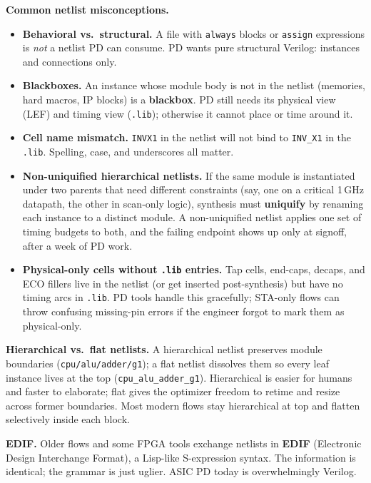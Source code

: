 \begin{pitfall}
\textbf{Common netlist misconceptions.}
\begin{itemize}
  \item \textbf{Behavioral vs.\ structural.} A file with \texttt{always} blocks or \texttt{assign} expressions is \emph{not} a netlist PD can consume. PD wants pure structural Verilog: instances and connections only.
  \item \textbf{Blackboxes.} An instance whose module body is not in the netlist (memories, hard macros, IP blocks) is a \textbf{blackbox}. PD still needs its physical view (LEF) and timing view (\texttt{.lib}); otherwise it cannot place or time around it.
  \item \textbf{Cell name mismatch.} \texttt{INVX1} in the netlist will not bind to \texttt{INV\_X1} in the \texttt{.lib}. Spelling, case, and underscores all matter.
  \item \textbf{Non-uniquified hierarchical netlists.} If the same module is instantiated under two parents that need different constraints (say, one on a critical 1\,GHz datapath, the other in scan-only logic), synthesis must \textbf{uniquify} by renaming each instance to a distinct module. A non-uniquified netlist applies one set of timing budgets to both, and the failing endpoint shows up only at signoff, after a week of PD work.
  \item \textbf{Physical-only cells without \texttt{.lib} entries.} Tap cells, end-caps, decaps, and ECO fillers live in the netlist (or get inserted post-synthesis) but have no timing arcs in \texttt{.lib}. PD tools handle this gracefully; STA-only flows can throw confusing missing-pin errors if the engineer forgot to mark them as physical-only.
\end{itemize}
\end{pitfall}

\begin{sidebar}
\textbf{Hierarchical vs.\ flat netlists.} A hierarchical netlist preserves module boundaries (\texttt{cpu/alu/adder/g1}); a flat netlist dissolves them so every leaf instance lives at the top (\texttt{cpu\_alu\_adder\_g1}). Hierarchical is easier for humans and faster to elaborate; flat gives the optimizer freedom to retime and resize across former boundaries. Most modern flows stay hierarchical at top and flatten selectively inside each block.

\textbf{EDIF.} Older flows and some FPGA tools exchange netlists in \textbf{EDIF} (Electronic Design Interchange Format), a Lisp-like S-expression syntax. The information is identical; the grammar is just uglier. ASIC PD today is overwhelmingly Verilog.
\end{sidebar}

